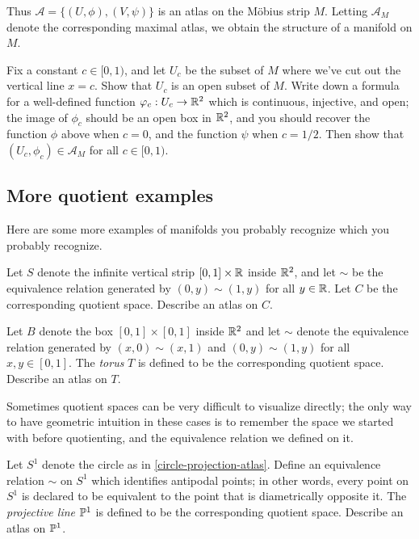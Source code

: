 Thus $\mathscr{A} = \{(U, \phi), (V, \psi)\}$ is an atlas on the M\"obius strip $M$. Letting $\mathscr{A}_M$ denote the corresponding maximal atlas, we obtain the structure of a manifold on $M$.

\begin{exercise}
	Fix a constant $c \in [0,1)$, and let $U_c$ be the subset of $M$ where we've cut out the vertical line $x = c$. Show that $U_c$ is an open subset of $M$. Write down a formula for a well-defined function $\varphi_c : U_c \to \mathbb{R}^2$ which is continuous, injective, and open; the image of $\phi_c$ should be an open box in $\mathbb{R}^2$, and you should recover the function $\phi$ above when $c = 0$, and the function $\psi$ when $c = 1/2$. Then show that $(U_c, \phi_c) \in \mathscr{A}_M$ for all $c \in [0,1)$. 
\end{exercise}

\subsection{More quotient examples}

Here are some more examples of manifolds you probably recognize which you probably recognize. 

\begin{exercise}[Cylinder] \label{cylinder}
	Let $S$ denote the infinite vertical strip $[0,1] \times \mathbb{R}$ inside $\mathbb{R}^2$, and let $\sim$ be the equivalence relation generated by $(0,y) \sim (1,y)$ for all $y \in \mathbb{R}$. Let $C$ be the corresponding quotient space. Describe an atlas on $C$. 
\end{exercise}

\begin{exercise}[Torus] \label{torus} 
	Let $B$ denote the box $[0,1] \times [0,1]$ inside $\mathbb{R}^2$ and let $\sim$ denote the equivalence relation generated by $(x,0) \sim (x,1)$ and $(0,y) \sim (1,y)$ for all $x,y \in [0,1]$. The \emph{torus} $T$ is defined to be the corresponding quotient space. Describe an atlas on $T$. 
\end{exercise}


Sometimes quotient spaces can be very difficult to visualize directly; the only way to have geometric intuition in these cases is to remember the space we started with before quotienting, and the equivalence relation we defined on it. 

\begin{exercise} \label{rp1}  
	Let $S^1$ denote the circle as in \cref{circle-projection-atlas}. Define an equivalence relation $\sim$ on $S^1$ which identifies antipodal points; in other words, every point on $S^1$ is declared to be equivalent to the point that is diametrically opposite it. The \emph{projective line} $\mathbb{P}^1$ is defined to be the corresponding quotient space. Describe an atlas on $\mathbb{P}^1$. 
\end{exercise}

